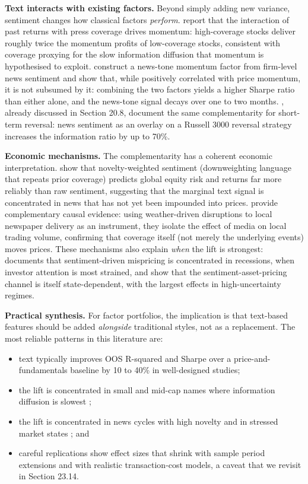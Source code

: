 \textbf{Text interacts with existing factors.} Beyond simply adding new variance, sentiment changes how classical factors \textit{perform}. \cite{hillert2014media} report that the interaction of past returns with press coverage drives momentum: high-coverage stocks deliver roughly twice the momentum profits of low-coverage stocks, consistent with coverage proxying for the slow information diffusion that momentum is hypothesised to exploit. \cite{heston2017news} construct a news-tone momentum factor from firm-level news sentiment and show that, while positively correlated with price momentum, it is not subsumed by it: combining the two factors yields a higher Sharpe ratio than either alone, and the news-tone signal decays over one to two months. \cite{hafez2014web}, already discussed in Section 20.8, document the same complementarity for short-term reversal: news sentiment as an overlay on a Russell 3000 reversal strategy increases the information ratio by up to 70\%.

\textbf{Economic mechanisms.} The complementarity has a coherent economic interpretation. \cite{calomiris2019news} show that novelty-weighted sentiment (downweighting language that repeats prior coverage) predicts global equity risk and returns far more reliably than raw sentiment, suggesting that the marginal text signal is concentrated in news that has not yet been impounded into prices. \cite{engelberg2011causal} provide complementary causal evidence: using weather-driven disruptions to local newspaper delivery as an instrument, they isolate the effect of media on local trading volume, confirming that coverage itself (not merely the underlying events) moves prices. These mechanisms also explain \textit{when} the lift is strongest: \cite{garcia2013sentiment} documents that sentiment-driven mispricing is concentrated in recessions, when investor attention is most strained, and \cite{sakariyahu2024chasing} show that the sentiment-asset-pricing channel is itself state-dependent, with the largest effects in high-uncertainty regimes.

\textbf{Practical synthesis.} For factor portfolios, the implication is that text-based features should be added \textit{alongside} traditional styles, not as a replacement. The most reliable patterns in this literature are:

\begin{itemize}
\item text typically improves OOS R-squared and Sharpe over a price-and-fundamentals baseline by 10 to 40\% in well-designed studies;
\item the lift is concentrated in small and mid-cap names where information diffusion is slowest \citep{hafez2014web};
\item the lift is concentrated in news cycles with high novelty \citep{calomiris2019news} and in stressed market states \citep{garcia2013sentiment}; and
\item careful replications show effect sizes that shrink with sample period extensions and with realistic transaction-cost models, a caveat that we revisit in Section 23.14.
\end{itemize}

